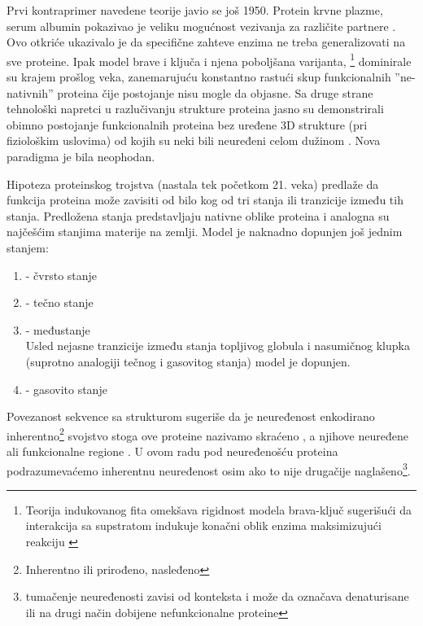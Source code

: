 Prvi kontraprimer navedene teorije javio se još 1950. Protein krvne plazme, serum
albumin pokazivao je veliku mogućnost vezivanja za različite
partnere \parencite{dunker2001}. Ovo otkriće ukazivalo je da specifične zahteve
enzima ne treba generalizovati na sve proteine. Ipak model brave i ključa i
njena poboljšana varijanta, \footnote{ Teorija
indukovanog fita omekšava rigidnost modela brava-ključ sugerišući da interakcija
sa supstratom indukuje konačni oblik enzima maksimizujući
reakciju \parencite{biology}}  dominirale su krajem
prošlog veka, zanemarujuću konstantno rastući skup funkcionalnih
''ne-nativnih'' proteina čije postojanje nisu mogle da objasne. Sa druge strane
tehnološki napretci u razlučivanju strukture proteina jasno su demonstrirali
obimno postojanje funkcionalnih proteina bez uređene 3D strukture (pri
fiziološkim uslovima)  od kojih su neki bili neuređeni celom
dužinom \parencite{dunker2001}.  Nova paradigma je bila neophodan.

Hipoteza proteinskog trojstva \parencite{dunker2001} (nastala tek početkom
21. veka) predlaže da funkcija proteina može zavisiti od bilo kog od tri
stanja ili tranzicije između tih stanja. Predložena stanja predstavljaju
nativne oblike proteina i analogna su najčešćim stanjima materije na zemlji.
Model je naknadno dopunjen još jednim stanjem:
\begin{enumerate}
  \item {} - čvrsto stanje

  \item {}  - tečno stanje

  \item {}  - međustanje\\ 
    Usled nejasne tranzicije između stanja topljivog globula i nasumičnog
    klupka (suprotno analogiji tečnog i gasovitog stanja\parencite{dunker2001})
    model je dopunjen.

  \item {}  - gasovito stanje
\end{enumerate}

Povezanost sekvence sa strukturom sugeriše da je neuređenost enkodirano
inherentno\footnote{ Inherentno ili prirođeno, nasleđeno} svojstvo \parencite{dunker2001}
stoga ove proteine nazivamo 
 skraćeno , a njihove neuređene
ali funkcionalne regione  \parencite{uversky2016}. U ovom radu pod
neuređenošću proteina podrazumevaćemo inherentnu neuređenost osim ako to nije
drugačije naglašeno\footnote{ tumačenje neuređenosti zavisi od konteksta i može
  da označava denaturisane ili na drugi način dobijene nefunkcionalne
proteine}.

